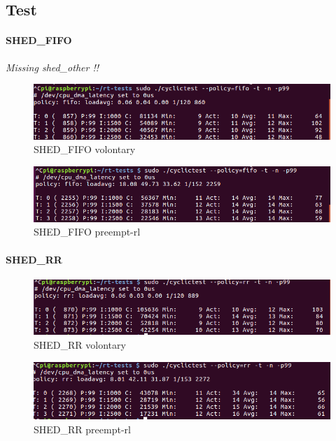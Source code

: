 \documentclass[10pt,a4paper]{article}
\begin{document}
\subsection{Test}
\paragraph{SHED\_FIFO}
\emph{Missing shed\_other !!}
\begin{figure}[H]
\includegraphics[width=16cm]{Voluntary-Fifo-WithoutHackbench.png}
\caption{SHED\_FIFO volontary}
\end{figure}
\begin{figure}[H]
\includegraphics[width=16cm]{Preempt-Fifo-WithoutHackbench.png}
\caption{SHED\_FIFO preempt-rl}
\end{figure}
\paragraph{SHED\_RR}
\begin{figure}[h]
\includegraphics[width=16cm]{Voluntary-RR-WithoutHackbench.png}
\caption{SHED\_RR volontary}
\end{figure}
\begin{figure}[H]
\includegraphics[width=16cm]{Preempt-RR-WithoutHackbench.png}
\caption{SHED\_RR preempt-rl}
\end{figure}
\end{document}
